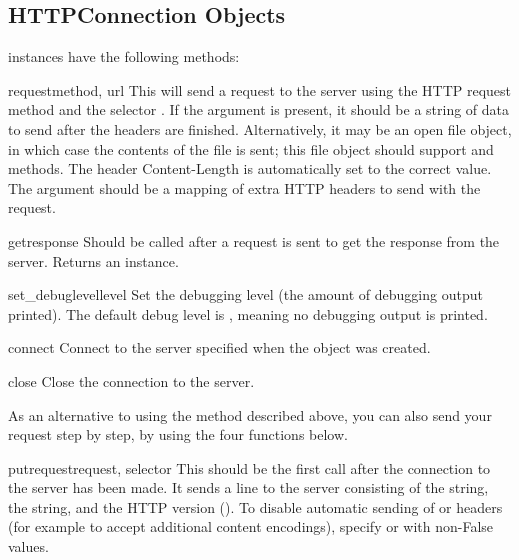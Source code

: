 \subsection{HTTPConnection Objects \label{httpconnection-objects}}

 instances have the following methods:

\begin{methoddesc}{request}{method, url}
This will send a request to the server using the HTTP request method
 and the selector .  If the  argument is
present, it should be a string of data to send after the headers are finished.
Alternatively, it may be an open file object, in which case the
contents of the file is sent; this file object should support
 and  methods.
The header Content-Length is automatically set to the correct value.
The  argument should be a mapping of extra HTTP headers to send
with the request.

\end{methoddesc}

\begin{methoddesc}{getresponse}{}
Should be called after a request is sent to get the response from the server.
Returns an  instance.
\end{methoddesc}

\begin{methoddesc}{set_debuglevel}{level}
Set the debugging level (the amount of debugging output printed).
The default debug level is , meaning no debugging output is
printed.
\end{methoddesc}

\begin{methoddesc}{connect}{}
Connect to the server specified when the object was created.
\end{methoddesc}

\begin{methoddesc}{close}{}
Close the connection to the server.
\end{methoddesc}

As an alternative to using the  method described above,
you can also send your request step by step, by using the four functions
below.

\begin{methoddesc}{putrequest}{request, selector}
This should be the first call after the connection to the server has
been made.  It sends a line to the server consisting of the
 string, the  string, and the HTTP version
().  To disable automatic sending of  or
 headers (for example to accept additional
content encodings), specify  or 
with non-False values.
\end{methoddesc}

